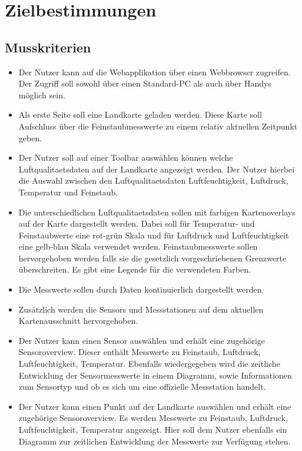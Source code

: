 \section{Zielbestimmungen}
\subsection{Musskriterien}
 \begin{itemize}
	\item Der Nutzer kann auf die Webapplikation über einen Webbrowser zugreifen. Der Zugriff soll sowohl über einen \gls{Standard-PC} als auch über Handys möglich sein.
	\item Als erste Seite soll eine Landkarte geladen werden. Diese Karte soll Aufschluss über die \gls{Feinstaub}messwerte zu einem relativ aktuellen Zeitpunkt geben.
	\item Der Nutzer soll auf einer \gls{Toolbar} auswählen können welche \gls{Luftqualitaetsdaten} auf der Landkarte angezeigt werden. Der Nutzer hierbei die Auswahl zwischen den \gls{Luftqualitaetsdaten} Luftfeuchtigkeit, Luftdruck, Temperatur und \gls{Feinstaub}.
	\item Die unterschiedlichen \gls{Luftqualitaetsdaten} sollen mit farbigen \glspl{Kartenoverlay} auf der Karte dargestellt werden. Dabei soll für Temperatur- und \gls{Feinstaub}werte eine rot-grün Skala und für Luftdruck und Luftfeuchtigkeit eine gelb-blau Skala verwendet werden. \gls{Feinstaub}messwerte sollen hervorgehoben werden falls sie die gesetzlich vorgeschriebenen Grenzwerte überschreiten. Es gibt eine Legende für die verwendeten Farben. 
	\item Die Messwerte sollen durch  Daten kontinuierlich dargestellt werden.
	\item Zusätzlich werden die \glspl{Sensor} und Messstationen auf dem aktuellen Kartenausschnitt hervorgehoben.
	\item Der Nutzer kann einen \gls{Sensor} auswählen und erhält eine zugehörige \gls{Sensoroverview}. Dieser enthält Messwerte zu \gls{Feinstaub}, Luftdruck, Luftfeuchtigkeit, Temperatur. Ebenfalls wiedergegeben wird die zeitliche Entwicklung der \gls{Sensor}messwerte in einem Diagramm, sowie Informationen zum Sensortyp und ob es sich um eine offizielle Messstation handelt.
	\item Der Nutzer kann einen Punkt auf der Landkarte auswählen und erhält eine zugehörige \gls{Sensoroverview}. Es werden  Messwerte zu \gls{Feinstaub}, Luftdruck, Luftfeuchtigkeit, Temperatur angezeigt. Hier soll dem Nutzer ebenfalls ein Diagramm zur zeitlichen Entwicklung der  Messwerte zur Verfügung stehen.

\end{itemize}
